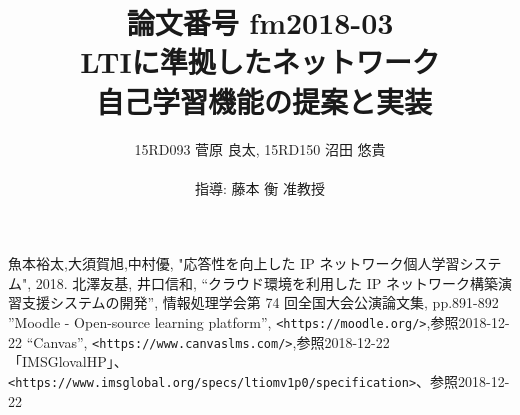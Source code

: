 \documentclass[twocolumn, a4paper]{jsarticle}
\title{\fontsize{10pt}{0pt}\selectfont 論文番号 fm2018-03\\ \fontsize{14pt}{0pt}\selectfont LTIに準拠したネットワーク\\自己学習機能の提案と実装}
\author{\fontsize{11pt}{0pt}\selectfont 15RD093 菅原 良太, 15RD150 沼田 悠貴\\ \\指導: 藤本 衡 准教授}
\date{}
\begin{document}
\twocolumn[
\pagestyle{normal}
\maketitle
]
\thispagestyle{normal}

\fontsize{9pt}{0pt}\selectfont











\begin{thebibliography}{9999}
   魚本裕太,大須賀旭,中村優, "応答性を向上した
IP ネットワーク個人学習システム", 2018.
   北澤友基, 井口信和, “クラウド環境を利用した IP ネットワーク構築演習支援システムの開発”, 情報処理学会第 74 回全国大会公演論文集, pp.891-892
   ”Moodle - Open-source learning platform”, \texttt{<https://moodle.org/>},参照2018-12-22
   “Canvas”, \texttt{<https://www.canvaslms.com/>},参照2018-12-22
   「IMSGlovalHP」、\texttt{<https://www.imsglobal.org/specs/ltiomv1p0/specification>}、参照2018-12-22
\end{thebibliography}


\end{document}
